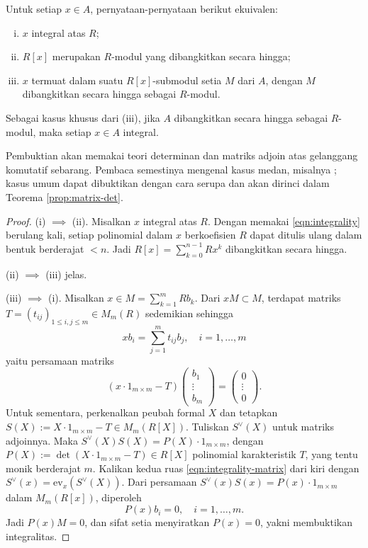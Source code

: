 \begin{theorem}\label{prop:integrality-finiteness}
	Untuk setiap $x \in A$, pernyataan-pernyataan berikut ekuivalen:
	\begin{enumerate}[(i)]
		\item $x$ integral atas $R$;
		\item $R[x]$ merupakan $R$-modul yang dibangkitkan secara hingga;
		\item $x$ termuat dalam suatu $R[x]$-submodul setia $M$ dari $A$, dengan $M$ dibangkitkan secara hingga sebagai $R$-modul.
	\end{enumerate}
	Sebagai kasus khusus dari (iii), jika $A$ dibangkitkan secara hingga sebagai $R$-modul, maka setiap $x \in A$ integral.
\end{theorem}
Pembuktian akan memakai teori determinan dan matriks adjoin atas gelanggang komutatif sebarang. Pembaca semestinya mengenal kasus medan, misalnya \cite[Proposisi 4.11]{Xi16}; kasus umum dapat dibuktikan dengan cara serupa dan akan dirinci dalam Teorema \ref{prop:matrix-det}.
\begin{proof}
	(i) $\implies$ (ii). Misalkan $x$ integral atas $R$. Dengan memakai \eqref{eqn:integrality} berulang kali, setiap polinomial dalam $x$ berkoefisien $R$ dapat ditulis ulang dalam bentuk berderajat $< n$. Jadi $R[x] = \sum_{k=0}^{n-1} R x^k$ dibangkitkan secara hingga.
	
	(ii) $\implies$ (iii) jelas.
	
	(iii) $\implies$ (i). Misalkan $x \in M = \sum_{k=1}^m R b_k$. Dari $xM \subset M$, terdapat matriks $T = (t_{ij})_{1 \leq i,j \leq m} \in M_m(R)$ sedemikian sehingga
	\[ x b_i = \sum_{j=1}^m t_{ij} b_j , \quad i = 1, \ldots, m \]
	yaitu persamaan matriks
	\begin{equation}\label{eqn:integrality-matrix}
		( x \cdot 1_{m \times m} - T) \begin{pmatrix} b_1 \\ \vdots \\ b_m \end{pmatrix}  = \begin{pmatrix} 0 \\ \vdots \\ 0 \end{pmatrix}.
	\end{equation}
	Untuk sementara, perkenalkan peubah formal $X$ dan tetapkan $S(X) := X \cdot 1_{m \times m} - T \in M_m(R[X])$. Tuliskan $S^\vee(X)$ untuk matriks adjoinnya. Maka $S^\vee(X) S(X) = P(X) \cdot 1_{m \times m}$, dengan $P(X) := \det(X \cdot 1_{m \times m} - T) \in R[X]$ polinomial karakteristik $T$, yang tentu monik berderajat $m$. Kalikan kedua ruas \eqref{eqn:integrality-matrix} dari kiri dengan $S^\vee(x) = \text{ev}_x(S^\vee(X))$. Dari persamaan $S^\vee(x)S(x) = P(x) \cdot 1_{m \times m}$ dalam $M_m(R[x])$, diperoleh
	\[ P(x) b_i = 0, \quad i=1, \ldots, m. \]
	Jadi $P(x) M=0$, dan sifat setia menyiratkan $P(x)=0$, yakni membuktikan integralitas.
\end{proof}

